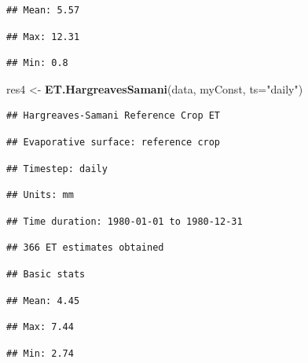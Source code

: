 \documentclass[
]{book}
\newenvironment{Shaded}{\begin{snugshade}}{\end{snugshade}}
\newcommand{\DataTypeTok}[1]{\textcolor[rgb]{0.13,0.29,0.53}{#1}}
\newcommand{\KeywordTok}[1]{\textcolor[rgb]{0.13,0.29,0.53}{\textbf{#1}}}
\newcommand{\NormalTok}[1]{#1}
\newcommand{\StringTok}[1]{\textcolor[rgb]{0.31,0.60,0.02}{#1}}
\begin{document}
\begin{verbatim}
## Mean: 5.57
\end{verbatim}

\begin{verbatim}
## Max: 12.31
\end{verbatim}

\begin{verbatim}
## Min: 0.8
\end{verbatim}

\begin{Shaded}
\begin{Highlighting}[]
\NormalTok{res4 <-}\StringTok{ }\KeywordTok{ET.HargreavesSamani}\NormalTok{(data, myConst, }\DataTypeTok{ts=}\StringTok{"daily"}\NormalTok{)}
\end{Highlighting}
\end{Shaded}

\begin{verbatim}
## Hargreaves-Samani Reference Crop ET
\end{verbatim}

\begin{verbatim}
## Evaporative surface: reference crop
\end{verbatim}

\begin{verbatim}
## Timestep: daily
\end{verbatim}

\begin{verbatim}
## Units: mm
\end{verbatim}

\begin{verbatim}
## Time duration: 1980-01-01 to 1980-12-31
\end{verbatim}

\begin{verbatim}
## 366 ET estimates obtained
\end{verbatim}

\begin{verbatim}
## Basic stats
\end{verbatim}

\begin{verbatim}
## Mean: 4.45
\end{verbatim}

\begin{verbatim}
## Max: 7.44
\end{verbatim}

\begin{verbatim}
## Min: 2.74
\end{verbatim}
\end{document}
